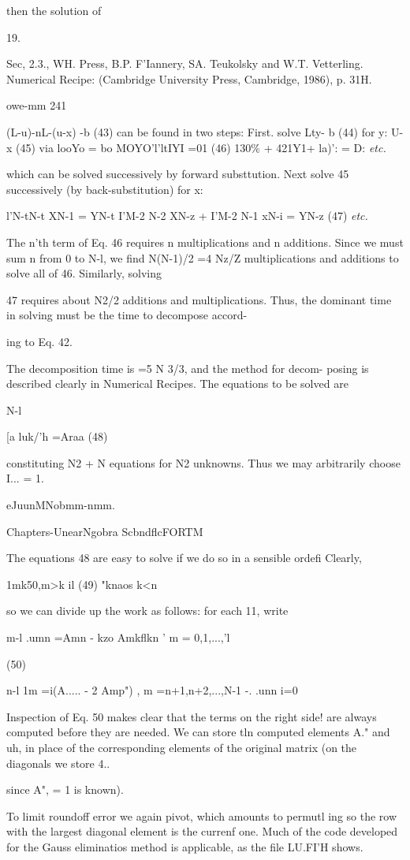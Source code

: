 then the solution of

 

19.

Sec, 2.3., WH. Press, B.P. F'Iannery, SA. Teukolsky and W.T. Vetterling. Numerical Recipe:
(Cambridge University Press, Cambridge, 1986), p. 31H.

owe-mm 241

(L-u)-nL-(u-x) -b (43)
can be found in two steps: First. solve
Lty- b (44)
for
y: U-x (45)
via
looYo = bo
MOYO'l'ltIYI =01 (46)
130\% + 421Y1+ la)': = D:
\textit{etc.}

which can be solved successively by forward substtution. Next
solve 45 successively (by back-substitution) for x:

l'N-tN-t XN-1 = YN-t
I'M-2 N-2 XN-z + I'M-2 N-1 xN-i = YN-z (47)
\textit{etc.}

The n'th term of Eq. 46 requires n multiplications and n additions.
Since we must sum n from 0 to N-l, we find N(N-1)/2 =4 Nz/Z
multiplications and additions to solve all of 46. Similarly, solving

47 requires about N2/2 additions and multiplications. Thus, the
dominant time in solving must be the time to decompose accord-

ing to Eq. 42.

The decomposition time is =5 N 3/3, and the method for decom-
posing is described clearly in Numerical Recipes. The equations
to be solved are

N-l

[a luk/'h =Araa (48)

constituting N2 + N equations for N2 unknowns. Thus we may
arbitrarily choose I... = 1.

eJuunMNobmm-nmm.

Chapters-UnearNgobra ScbndflcFORTM

The equations 48 are easy to solve if we do so in a sensible ordefi
Clearly,

1mk50,m>k il
(49)
"knaos k<n

so we can divide up the work as follows: for each 11, write

 

 

m-l
.umn =Amn - kzo Amkflkn ' m = 0,1,...,'l

(50)

n-l
1m =i(A..... - 2 Amp") , m =n+1,n+2,...,N-1 -.
.unn i=0

 

Inspection of Eq. 50 makes clear that the terms on the right side!
are always computed before they are needed. We can store tln
computed elements A." and uh, in place of the corresponding
elements of the original matrix (on the diagonals we store  4..

since A", = 1 is known).

To limit roundoff error we again pivot, which amounts to permutl
ing so the row with the largest diagonal element is the currenf
one. Much of the code developed for the Gauss eliminatios
method is applicable, as the file LU.FI'H shows.

